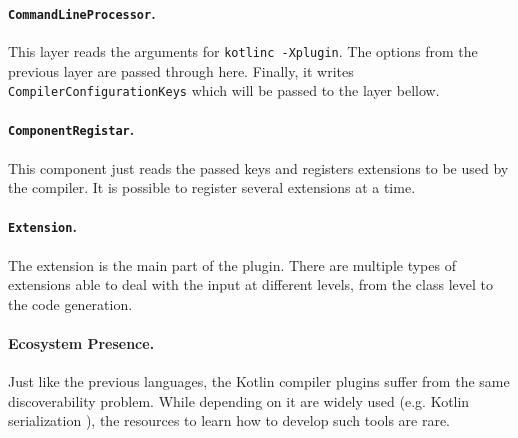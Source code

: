 \paragraph{\texttt{CommandLineProcessor}.}
This layer reads the arguments for \texttt{kotlinc -Xplugin}.
The options from the previous layer are passed through here.
Finally, it writes \texttt{CompilerConfigurationKeys} which will be passed to the layer bellow.

\paragraph{\texttt{ComponentRegistar}.}
This component just reads the passed keys and registers extensions to be used by the compiler.
It is possible to register several extensions at a time.

\paragraph{\texttt{Extension}.}
The extension is the main part of the plugin.
There are multiple types of extensions able to deal with the input at different levels,
from the class level to the code generation.

\paragraph{Ecosystem Presence.}
Just like the previous languages, the Kotlin compiler plugins suffer from the same discoverability problem.
While depending on it are widely used (e.g. Kotlin serialization \autocite{Kotlin2021}),
the resources to learn how to develop such tools are rare.

